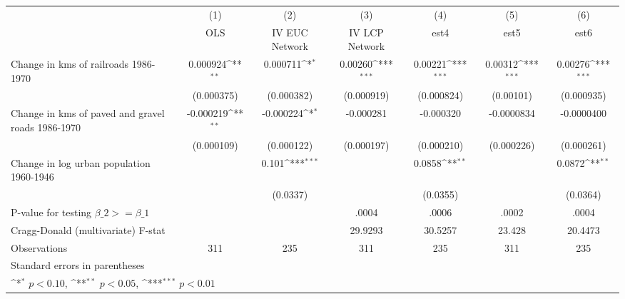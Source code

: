 {
\def\sym#1{\ifmmode^{#1}\else\(^{#1}\)\fi}
\begin{tabular}{l*{6}{c}}
\hline\hline
                &\multicolumn{1}{c}{(1)}&\multicolumn{1}{c}{(2)}&\multicolumn{1}{c}{(3)}&\multicolumn{1}{c}{(4)}&\multicolumn{1}{c}{(5)}&\multicolumn{1}{c}{(6)}\\
                &\multicolumn{1}{c}{OLS}&\multicolumn{1}{c}{IV EUC Network}&\multicolumn{1}{c}{IV LCP Network}&\multicolumn{1}{c}{est4}&\multicolumn{1}{c}{est5}&\multicolumn{1}{c}{est6}\\
\hline
Change in kms of railroads 1986-1970& 0.000924\sym{**} & 0.000711\sym{*}  &  0.00260\sym{***}&  0.00221\sym{***}&  0.00312\sym{***}&  0.00276\sym{***}\\
                &(0.000375)         &(0.000382)         &(0.000919)         &(0.000824)         &(0.00101)         &(0.000935)         \\
[1em]
Change in kms of paved and gravel roads 1986-1970&-0.000219\sym{**} &-0.000224\sym{*}  &-0.000281         &-0.000320         &-0.0000834         &-0.0000400         \\
                &(0.000109)         &(0.000122)         &(0.000197)         &(0.000210)         &(0.000226)         &(0.000261)         \\
[1em]
Change in log urban population 1960-1946&                  &    0.101\sym{***}&                  &   0.0858\sym{**} &                  &   0.0872\sym{**} \\
                &                  & (0.0337)         &                  & (0.0355)         &                  & (0.0364)         \\
\hline
P-value for testing $\beta\_{2} >= \beta\_{1}$&                  &                  &    .0004         &    .0006         &    .0002         &    .0004         \\
Cragg-Donald (multivariate) F-stat&                  &                  &  29.9293         &  30.5257         &   23.428         &  20.4473         \\
Observations    &      311         &      235         &      311         &      235         &      311         &      235         \\
\hline\hline
\multicolumn{7}{l}{\footnotesize Standard errors in parentheses}\\
\multicolumn{7}{l}{\footnotesize \sym{*} \(p<0.10\), \sym{**} \(p<0.05\), \sym{***} \(p<0.01\)}\\
\end{tabular}
}

